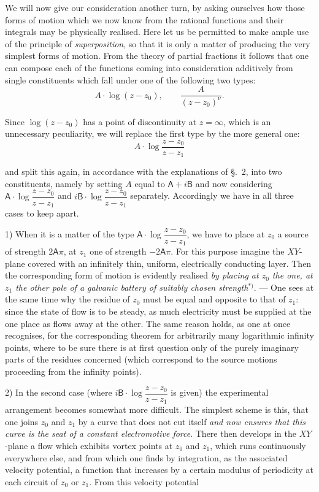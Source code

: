 \documentclass{article}
\begin{document}
We will now give our consideration another turn, by asking ourselves how those forms of motion which we now know from the rational functions and their integrals may be physically realised. Here let us be permitted to make ample use of the principle of \emph{superposition}, so that it is only a matter of producing the very simplest forms of motion. From the theory of partial fractions it follows that one can compose each of the functions coming into consideration additively from single constituents which fall under one of the following two types:
\[ A \cdot \log (z - z_{0}), \qquad \frac{A}{(z - z_{0})^{\nu}}. \]

Since $\log (z - z_{0})$ has a point of discontinuity at $z = \infty$, which is an unnecessary peculiarity, we will replace the first type by the more general one:
\[ A \cdot \log \frac{z - z_{0}}{z - z_{1}} \]

and split this again, in accordance with the explanations of §.~2, into two constituents, namely by setting $A$ equal to $\mathsf{A} + i\mathsf{B}$ and now considering $\mathsf{A} \cdot \log \dfrac{z - z_{0}}{z - z_{1}}$ and $i\mathsf{B} \cdot \log \dfrac{z - z_{0}}{z - z_{1}}$ separately. Accordingly we have in all three cases to keep apart.

1) When it is a matter of the type $\mathsf{A} \cdot \log \dfrac{z - z_{0}}{z - z_{1}}$, we have to place at $z_{0}$ a source of strength $2\mathsf{A}\pi$, at $z_{1}$ one of strength $-2\mathsf{A}\pi$. For this purpose imagine the $XY$-plane covered with an infinitely thin, uniform, electrically conducting layer. Then the corresponding form of motion is evidently realised \emph{by placing at $z_{0}$ the one, at $z_{1}$ the other pole of a galvanic battery of suitably chosen strength}${}^{*)}$. --- One sees at the same time why the residue of $z_{0}$ must be equal and opposite to that of $z_{1}$: since the state of flow is to be steady, as much electricity must be supplied at the one place as flows away at the other. The same reason holds, as one at once recognises, for the corresponding theorem for arbitrarily many logarithmic infinity points, where to be sure there is at first question only of the purely imaginary parts of the residues concerned (which correspond to the source motions proceeding from the infinity points).

2) In the second case (where $i\mathsf{B} \cdot \log \dfrac{z - z_{0}}{z - z_{1}}$ is given) the experimental arrangement becomes somewhat more difficult. The simplest scheme is this, that one joins $z_{0}$ and $z_{1}$ by a curve that does not cut itself \emph{and now ensures that this curve is the seat of a constant electromotive force}. There then develops in the $XY$-plane a flow which exhibits vortex points at $z_{0}$ and $z_{1}$, which runs continuously everywhere else, and from which one finds by integration, as the associated velocity potential, a function that increases by a certain modulus of periodicity at each circuit of $z_{0}$ or $z_{1}$. From this velocity potential
\end{document}
